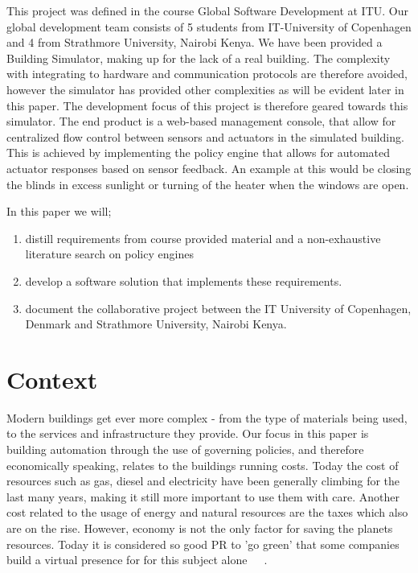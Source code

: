 This project was defined in the course Global Software Development at ITU. Our global development team consists of 5 students from IT-University of Copenhagen and 4 from Strathmore University, Nairobi Kenya. We have been provided a Building Simulator, making up for the lack of a real building. The complexity with integrating to hardware and communication protocols are therefore avoided, however the simulator has provided other complexities as will be evident later in this paper. The development focus of this project is therefore geared towards this simulator. The end product is a web-based management console, that allow for centralized flow control between sensors and actuators in the simulated building. This is achieved by implementing the policy engine that allows for automated actuator responses based on sensor feedback. An example at this would be closing the blinds in excess sunlight or turning of the heater when the windows are open.

In this paper we will; 
\begin{enumerate}
	\item distill requirements from course provided material and a non-exhaustive literature search on policy engines
	\item develop a software solution that implements these requirements.
	\item document the collaborative project between the IT University of Copenhagen, Denmark and Strathmore University, Nairobi Kenya.
\end{enumerate}

\section{Context}
Modern buildings get ever more complex - from the type of materials being used, to the services and infrastructure they provide. Our focus in this paper is building automation through the use of governing policies, and therefore economically speaking, relates to the buildings running costs. Today the cost of resources such as gas, diesel and electricity have been generally climbing for the last many years, making it still more important to use them with care. Another cost related to the usage of energy and natural resources are the taxes which also are on the rise. However, economy is not the only factor for saving the planets resources. Today it is considered so good PR to 'go green' that some companies build a virtual presence for for this subject alone~\cite{green-google}~\cite{green-facebook}~\cite{green-microsoft}.

